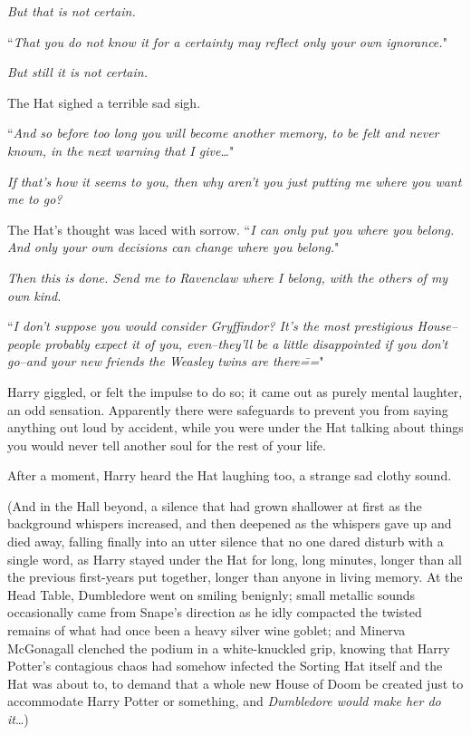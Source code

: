 \emph{But that is not certain.}

``\emph{That \emph{you} do not \emph{know} it for a certainty may reflect only \emph{your} own ignorance.}"

\emph{But still it is not certain.}

The Hat sighed a terrible sad sigh.

``\emph{And so before too long you will become another memory, to be felt and never known, in the next warning that I give{\ldots}}"

\emph{If that's how it seems to you, then why aren't you just \emph{putting} me where you want me to go?}

The Hat's thought was laced with sorrow. ``\emph{I can only put you where you belong. And only your own decisions can change where you belong.}"

\emph{Then this is done. Send me to Ravenclaw where I belong, with the others of my own kind.}

``\emph{I don't suppose you would consider Gryffindor? It's the most prestigious House\---people probably expect it of you, even\---they'll be a little disappointed if you don't go\---and your new friends the Weasley twins are there\===}"

Harry giggled, or felt the impulse to do so; it came out as purely mental laughter, an odd sensation. Apparently there were safeguards to prevent you from saying anything out loud by accident, while you were under the Hat talking about things you would never tell another soul for the rest of your life.

After a moment, Harry heard the Hat laughing too, a strange sad clothy sound.

(And in the Hall beyond, a silence that had grown shallower at first as the background whispers increased, and then deepened as the whispers gave up and died away, falling finally into an utter silence that no one dared disturb with a single word, as Harry stayed under the Hat for long, long minutes, longer than all the previous first-years put together, longer than anyone in living memory. At the Head Table, Dumbledore went on smiling benignly; small metallic sounds occasionally came from Snape's direction as he idly compacted the twisted remains of what had once been a heavy silver wine goblet; and Minerva McGonagall clenched the podium in a white-knuckled grip, knowing that Harry Potter's contagious chaos had somehow infected the Sorting Hat itself and the Hat was about to, to demand that a whole new House of Doom be created just to accommodate Harry Potter or something, and \emph{Dumbledore would make her do it}{\ldots})

